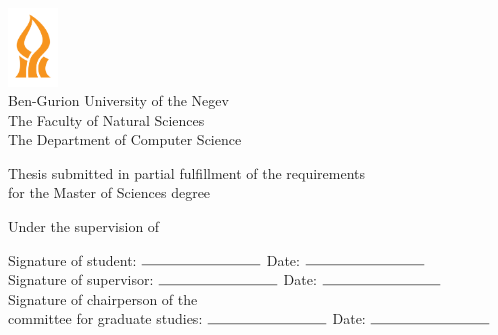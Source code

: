 \begin{titlepage}
    \begin{center}
    \doublespacing

        \vspace*{1cm}
        
        \includegraphics[width=0.1\textwidth]{01Cover/Images/bgu.png}\\
        Ben-Gurion University of the Negev\\
        The Faculty of Natural Sciences\\
        The Department of Computer Science
        
        \vspace{1cm}
        
        {\Large \thesistitle}
        
        \vspace{0.5cm}
        
        Thesis submitted in partial fulfillment of the requirements\\for the Master of Sciences degree
        
        \vspace{0.5cm}
        
        \thesisauthorname
        
        \vspace{0.5cm}
        
        Under the supervision of \thesissupervisername
        
        \vspace{0.5cm}
        
        \begin{flushleft}
        Signature of student: \( \rule{3cm}{0.15mm} \) \hfill Date: \( \rule{3cm}{0.15mm} \)\\
        Signature of supervisor: \( \rule{3cm}{0.15mm} \) \hfill Date: \( \rule{3cm}{0.15mm} \)\\
        Signature of chairperson of the\\committee for graduate studies: \( \rule{3cm}{0.15mm} \) \hfill Date: \( \rule{3cm}{0.15mm} \)
        \end{flushleft}
        
        \vfill
        
        \thesismonth \quad \thesisyear
    \end{center}
\end{titlepage}